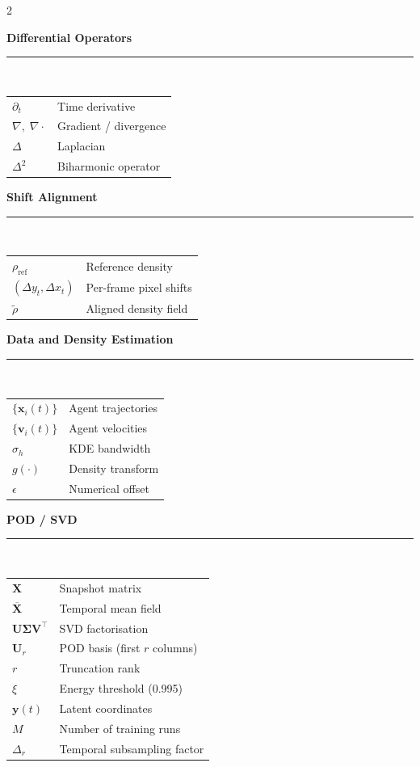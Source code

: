\begin{multicols}{2}
{\vspace{3pt}\noindent\textbf{Differential Operators}\\[-2pt]
\rule{\columnwidth}{0.4pt}\\[2pt]
\begin{tabular}{@{}p{}p{}@{}}
$\partial_t$ & Time derivative \\
$\nabla,\;\nabla\!\cdot$ & Gradient / divergence \\
$\Delta$ & Laplacian \\
$\Delta^2$ & Biharmonic operator \\
\end{tabular}

\vspace{3pt}\noindent\textbf{Shift Alignment}\\[-2pt]
\rule{\columnwidth}{0.4pt}\\[2pt]
\begin{tabular}{@{}p{}p{}@{}}
$\rho_{\mathrm{ref}}$ & Reference density \\
$(\Delta y_t,\Delta x_t)$ & Per-frame pixel shifts \\
$\tilde{\rho}$ & Aligned density field \\
\end{tabular}

\vspace{3pt}\noindent\textbf{Data and Density Estimation}\\[-2pt]
\rule{\columnwidth}{0.4pt}\\[2pt]
\begin{tabular}{@{}p{}p{}@{}}
$\{\mathbf{x}_i(t)\}$ & Agent trajectories \\
$\{\mathbf{v}_i(t)\}$ & Agent velocities \\
$\sigma_h$ & KDE bandwidth \\
$g(\cdot)$ & Density transform \\
$\epsilon$ & Numerical offset \\
\end{tabular}

\vspace{3pt}\noindent\textbf{POD / SVD}\\[-2pt]
\rule{\columnwidth}{0.4pt}\\[2pt]
\begin{tabular}{@{}p{}p{}@{}}
$\mathbf{X}$ & Snapshot matrix \\
$\overline{\mathbf{X}}$ & Temporal mean field \\
$\mathbf{U}\boldsymbol{\Sigma}\mathbf{V}^{\!\top}$ & SVD factorisation \\
$\mathbf{U}_r$ & POD basis (first $r$ columns) \\
$r$ & Truncation rank \\
$\xi$ & Energy threshold (0.995) \\
$\mathbf{y}(t)$ & Latent coordinates \\
$M$ & Number of training runs \\
$\Delta_r$ & Temporal subsampling factor \\
\end{tabular}

}
\end{multicols}
